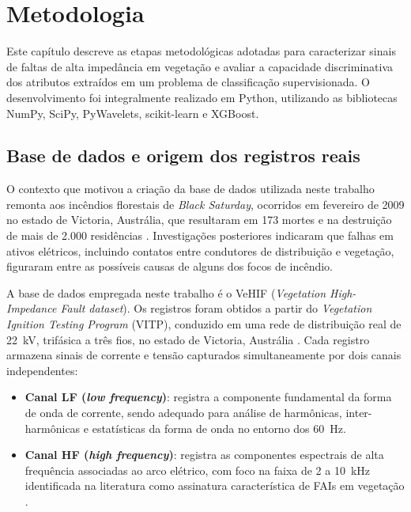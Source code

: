 %
%
\chapter{Metodologia}\label{chap:metodologia}

Este capítulo descreve as etapas metodológicas adotadas para caracterizar sinais de faltas de alta impedância em vegetação e avaliar a capacidade discriminativa dos atributos extraídos em um problema de classificação supervisionada. O desenvolvimento foi integralmente realizado em Python, utilizando as bibliotecas NumPy, SciPy, PyWavelets, scikit-learn e XGBoost.

\section{Base de dados e origem dos registros reais}\label{sec:met_dataset}

O contexto que motivou a criação da base de dados utilizada neste trabalho
remonta aos incêndios florestais de \textit{Black Saturday}, ocorridos em
fevereiro de 2009 no estado de Victoria, Austrália, que resultaram em 173
mortes e na destruição de mais de 2.000 residências
\cite{vic_bushfire_report}. Investigações posteriores indicaram que falhas em
ativos elétricos, incluindo contatos entre condutores de distribuição e
vegetação, figuraram entre as possíveis causas de alguns dos focos de incêndio.

A base de dados empregada neste trabalho é o VeHIF (\textit{Vegetation High-Impedance Fault dataset}). Os registros foram obtidos a partir do \textit{Vegetation Ignition Testing Program} (VITP), conduzido em uma rede de distribuição real de 22~kV, trifásica a três fios, no estado de Victoria, Austrália \cite{8, Gomes2021VeHIF}. Cada registro armazena sinais de corrente e tensão capturados simultaneamente por dois canais independentes:

\begin{itemize}
    \item \textbf{Canal LF (\textit{low frequency})}: registra a componente fundamental da forma de onda de corrente, sendo adequado para análise de harmônicas, inter-harmônicas e estatísticas da forma de onda no entorno dos 60~Hz.
    \item \textbf{Canal HF (\textit{high frequency})}: registra as componentes espectrais de alta frequência associadas ao arco elétrico, com foco na faixa de 2 a 10~kHz identificada na literatura como assinatura característica de FAIs em vegetação \cite{1, 8}.
\end{itemize}

